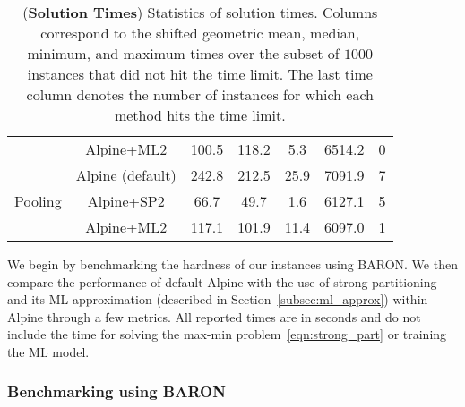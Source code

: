 \documentclass{article}
\begin{document}
\begin{table}[t]
\begin{tabular}{ c | c | c c c c | c }
&  Alpine+ML2  &  100.5  &  118.2  &  5.3  &  6514.2  &  0  \\[0.1in]
&  Alpine (default)  &  242.8  &  212.5  &  25.9  &  7091.9  &  7  \\
Pooling  &  Alpine+SP2  &  66.7  &  49.7  &  1.6  &  6127.1  & 5  \\
&  Alpine+ML2  &  117.1  &  101.9  &  11.4  &  6097.0  &  1  \\ \hline
\end{tabular}
\caption{
(\textbf{Solution Times}) Statistics of solution times. 
Columns correspond to the shifted geometric mean, median, minimum, and maximum times over the subset of $1000$ instances that did not hit the time limit. 
The last time column denotes the number of instances for which each method hits the time limit.
}
\label{tab:alpine_times}
\end{table}






We begin by benchmarking the hardness of our instances using BARON.
We then compare the performance of default Alpine with the use of strong partitioning and its ML approximation (described in Section~\ref{subsec:ml_approx}) within Alpine through a few metrics.
All reported times are in seconds and do not include the time for solving the max-min problem~\eqref{eqn:strong_part} or training the ML model. 



\subsubsection{Benchmarking using BARON}
\label{subsubsec:baron_benchmark}
\end{document}
